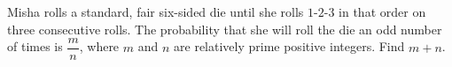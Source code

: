 Misha rolls a standard, fair six-sided die until she rolls \(1\)-\(2\)-\(3\) in that order on three consecutive rolls. The probability that she will roll the die an odd number of times is \(\dfrac{m}{n}\), where \(m\) and \(n\) are relatively prime positive integers. Find \(m+n\).
